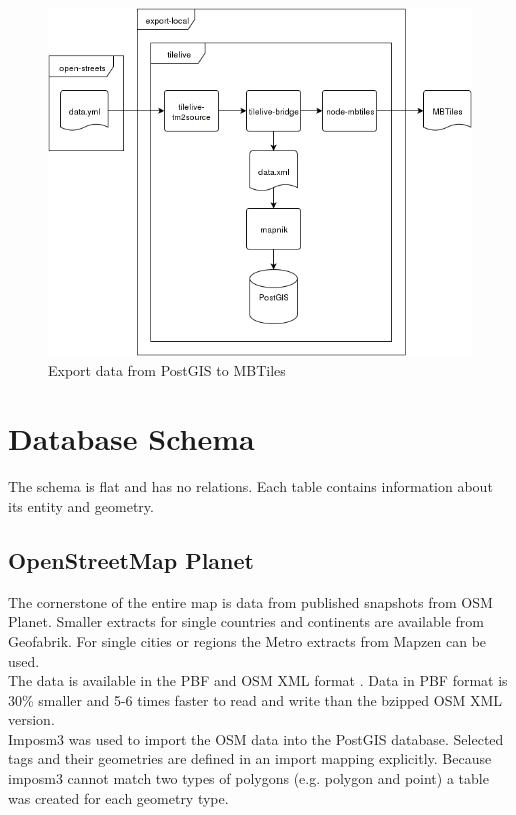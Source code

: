 \begin{figure}[H]
\centering
  \includegraphics[scale=0.6]{images/export_package_flow.png}
  \caption{Export data from PostGIS to MBTiles}
\end{figure}

\newpage
\section{Database Schema}\label{database-schema}
The schema is flat and has no relations. Each table contains information about its entity and geometry. 

\subsection{OpenStreetMap Planet}

The cornerstone of the entire map is \osm{} data from published snapshots from OSM Planet\cite{5_wiki.openstreetmap.org_2015}.
Smaller extracts for single countries and continents are available from Geofabrik\cite{7_download.geofabrik.de_2015}.
For  single cities or regions the Metro extracts from Mapzen\cite{8_mapzen.com_2015} can be used.
\\
The data is available in the PBF\cite{9_wiki.openstreetmap.org_2015} and OSM XML format \cite{10_wiki.openstreetmap.org_2015}. 
Data in PBF format is 30\% smaller and 5-6 times faster to read and write than the bzipped OSM XML version.
\\
Imposm3 was used to import the OSM data into the PostGIS database.
Selected tags\cite{11_wiki.openstreetmap.org_2015} and their geometries are defined in an import mapping explicitly.
Because imposm3 cannot match two types of polygons (e.g. polygon and point) a table was created for each geometry type.


